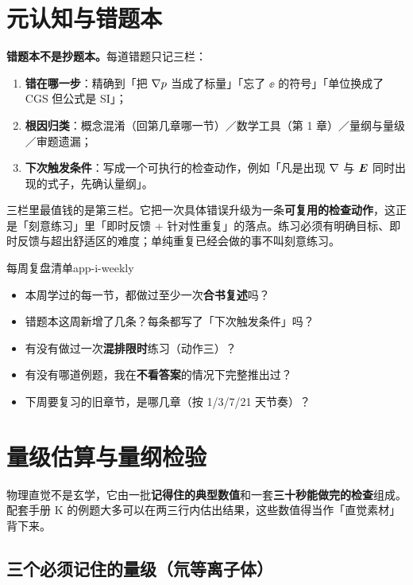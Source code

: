 \section{元认知与错题本}

\textbf{错题本不是抄题本。}每道错题只记三栏：

\begin{enumerate}
\item \textbf{错在哪一步}：精确到「把 $\nabla p$ 当成了标量」「忘了 $\ee$ 的符号」「单位换成了 CGS 但公式是 SI」；
\item \textbf{根因归类}：概念混淆（回第几章哪一节）／数学工具（第 1 章）／量纲与量级／审题遗漏；
\item \textbf{下次触发条件}：写成一个可执行的检查动作，例如「凡是出现 $\nabla$ 与 $\bm{E}$ 同时出现的式子，先确认量纲」。
\end{enumerate}

三栏里最值钱的是第三栏。它把一次具体错误升级为一条\textbf{可复用的检查动作}，这正是「刻意练习」里「即时反馈 + 针对性重复」的落点。练习必须有明确目标、即时反馈与超出舒适区的难度；单纯重复已经会做的事不叫刻意练习。

\begin{checklistbox}{每周复盘清单}{app-i-weekly}
\begin{itemize}
\item 本周学过的每一节，都做过至少一次\textbf{合书复述}吗？
\item 错题本这周新增了几条？每条都写了「下次触发条件」吗？
\item 有没有做过一次\textbf{混排限时}练习（动作三）？
\item 有没有哪道例题，我在\textbf{不看答案}的情况下完整推出过？
\item 下周要复习的旧章节，是哪几章（按 1/3/7/21 天节奏）？
\end{itemize}
\end{checklistbox}


\section{量级估算与量纲检验}

物理直觉不是玄学，它由一批\textbf{记得住的典型数值}和一套\textbf{三十秒能做完的检查}组成。配套手册 K 的例题大多可以在两三行内估出结果，这些数值得当作「直觉素材」背下来。

\subsection{三个必须记住的量级（氘等离子体）}

